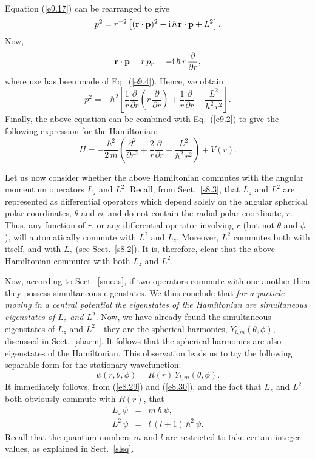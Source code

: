 Equation (\ref{e9.17}) can be rearranged to give
\begin{equation}
p^2 = r^{-2}\left[({\bf r}\cdot{\bf p})^2- {\rm i}\,\hbar\,{\bf r}\cdot{\bf p}+L^2\right].
\end{equation}
Now,
\begin{equation}
{\bf r}\cdot{\bf p} = r\,p_r = -{\rm i}\,\hbar\,r\,\frac{\partial}{\partial r},
\end{equation}
where use has been made of Eq.~(\ref{e9.4}). Hence, we obtain
\begin{equation}
p^2 = -\hbar^2\left[\frac{1}{r}\frac{\partial}{\partial r}\left(r\,\frac{\partial}{\partial r}\right)
+ \frac{1}{r}\frac{\partial}{\partial r}- \frac{L^2}{\hbar^2\,r^2}\right].
\end{equation}
Finally, the above equation can be combined with Eq.~(\ref{e9.2})
to give the following expression for the Hamiltonian:
\begin{equation}\label{e9.21}
H = -\frac{\hbar^2}{2\,m}\left(\frac{\partial^2}{\partial r^2}
+ \frac{2}{r}\frac{\partial}{\partial r}- \frac{L^2}{\hbar^2\,r^2}\right)
+V(r).
\end{equation}

Let us now consider whether the above Hamiltonian commutes with
the angular momentum operators $L_z$ and $L^2$. Recall, from 
Sect.~\ref{s8.3}, that $L_z$ and $L^2$ are represented as differential
operators which depend solely on the angular spherical polar
coordinates, $\theta$ and $\phi$, and do not contain the radial
polar coordinate, $r$. Thus, any function of $r$, or any differential
operator involving $r$ (but not $\theta$ and $\phi$), will automatically
commute with $L^2$ and $L_z$. Moreover, $L^2$ commutes
both with itself, and with $L_z$ (see Sect.~\ref{s8.2}). It
is, therefore, clear that the above Hamiltonian  commutes with
both $L_z$ and $L^2$. 

Now, according to Sect.~\ref{smeas}, if two operators commute with
one another then they possess simultaneous eigenstates. We thus conclude
that {\em for a particle moving in a central potential the eigenstates of the
Hamiltonian are simultaneous eigenstates of $L_z$ and $L^2$}.
Now, we have already found the simultaneous eigenstates of
$L_z$ and $L^2$---they are the spherical harmonics, $Y_{l,m}(\theta,\phi)$,
discussed in Sect.~\ref{sharm}. It follows that the spherical
harmonics are also eigenstates of the Hamiltonian. This observation leads
us to try the following separable form for the stationary
wavefunction:
\begin{equation}\label{e9.22}
\psi(r,\theta,\phi) = R(r)\,Y_{l,m}(\theta,\phi).
\end{equation}
It immediately follows, from (\ref{e8.29}) and (\ref{e8.30}), and the
fact that $L_z$ and $L^2$ both obviously commute with $R(r)$, that
\begin{eqnarray}
L_z\,\psi &=& m\,\hbar\,\psi,\\[0.5ex]
L^2\,\psi&=& l\,(l+1)\,\hbar^2\,\psi.\label{e9.24}
\end{eqnarray}
Recall that the quantum numbers $m$ and $l$ are restricted to take certain
integer values, as explained in Sect.~\ref{slsq}.

